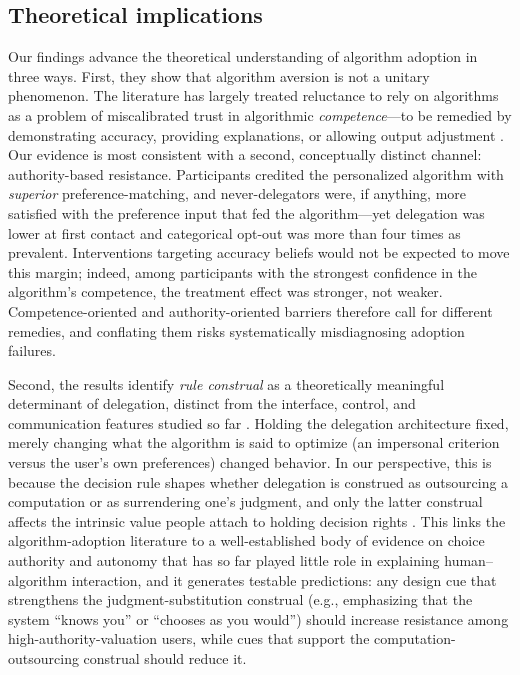 \documentclass[a4paper, 12pt, fleqn]{article}
\theoremstyle{definition}
\begin{document}
\subsection{Theoretical implications}
Our findings advance the theoretical understanding of algorithm adoption in three ways.
First, they show that algorithm aversion is not a unitary phenomenon. The literature has largely treated reluctance to rely on algorithms as a problem of miscalibrated trust in algorithmic \emph{competence}---to be remedied by demonstrating accuracy, providing explanations, or allowing output adjustment \citep{Dietvorst2018,Yeomans2019,Leichtmann2023}. Our evidence is most consistent with a second, conceptually distinct channel: authority-based resistance. Participants credited the personalized algorithm with \emph{superior} preference-matching, and never-delegators were, if anything, more satisfied with the preference input that fed the algorithm---yet delegation was lower at first contact and categorical opt-out was more than four times as prevalent. Interventions targeting accuracy beliefs would not be expected to move this margin; indeed, among participants with the strongest confidence in the algorithm's competence, the treatment effect was stronger, not weaker. Competence-oriented and authority-oriented barriers therefore call for different remedies, and conflating them risks systematically misdiagnosing adoption failures.

Second, the results identify \emph{rule construal} as a theoretically meaningful determinant of delegation, distinct from the interface, control, and communication features studied so far \citep{Dietvorst2018,Hildebrand2021,Fink2024}. Holding the delegation architecture fixed, merely changing what the algorithm is said to optimize (an impersonal criterion versus the user's own preferences) changed behavior. In our perspective, this is because the decision rule shapes whether delegation is construed as outsourcing a computation or as surrendering one's judgment, and only the latter construal affects the intrinsic value people attach to holding decision rights \citep{Bartling2014,Owens2014,FreyBenzStutzer2004}. This links the algorithm-adoption literature to a well-established body of evidence on choice authority and autonomy \citep{Brehm1966,DeciRyan2000,Leotti2010} that has so far played little role in explaining human--algorithm interaction, and it generates testable predictions: any design cue that strengthens the judgment-substitution construal (e.g., emphasizing that the system ``knows you'' or ``chooses as you would'') should increase resistance among high-authority-valuation users, while cues that support the computation-outsourcing construal should reduce it.
\end{document}
